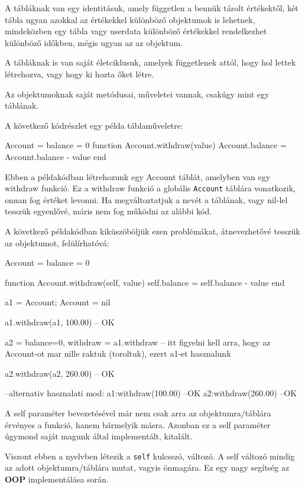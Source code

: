 A tábláknak van egy identitásuk, amely független a bennük tárolt értékektől, két tábla ugyan azokkal az értékekkel különböző objektumok is lehetnek, mindeközben egy tábla vagy userdata különböző értékekkel rendelkezhet különböző időkben, mégis ugyan az az objektum.

A tábláknak is van saját életciklusuk, amelyek függetlenek attól, hogy hol lettek létrehozva, vagy hogy ki hozta őket létre.

Az objektumoknak saját metódusai, műveletei vannak, csakúgy mint egy táblának.

A következő kódrészlet egy példa táblaműveletre:
\begin{lua}
Account = {balance = 0}
function Account.withdraw(value)
	Account.balance = Account.balance - value
end
\end{lua}
Ebben a példakódban létrehozunk egy Account táblát, amelyben van egy withdraw funkció. Ez a withdraw funkció a globális \texttt{Account} táblára vonatkozik, onnan fog értéket levonni. Ha megváltoztatjuk a nevét a táblának, vagy nil-lel tesszük egyenlővé, máris nem fog működni az alábbi kód.

A következő példakódban kiküszöböljük ezen problémákat, átnevezhetővé tesszük az objektumot, felülírhatóvá:

\begin{lua}
Account = {balance = 0}

function Account.withdraw(self, value)
	self.balance = self.balance - value
end 

a1 = Account; Account = nil

a1.withdraw(a1, 100.00)   -- OK

a2 = {balance=0, withdraw = a1.withdraw} -- itt figyelni kell arra, hogy az Account-ot mar nille raktuk (toroltuk), ezert a1-et hasznalunk 

a2.withdraw(a2, 260.00) -- OK

--alternativ hasznalati mod:
a1:withdraw(100.00) --OK
a2:withdraw(260.00) --OK
\end{lua}

A self paraméter bevezetésével már nem csak arra az objektumra/táblára érvényes a funkció, hanem bármelyik másra. Azonban ez a self paraméter úgymond saját magunk által implementált, kitalált.

Viszont ebben a nyelvben létezik a \texttt{self} kulcsszó, változó. A self változó mindig az adott objektumra/táblára mutat, vagyis önmagára. Ez egy nagy segítség az \textbf{OOP} implementálása során.

